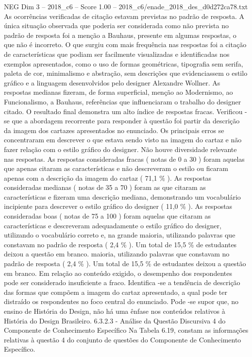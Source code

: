 \begin{textsample}{NEG Dim 3 – 2018\_c6 – Score 1.00 – 2018\_c6/enade\_2018\_des\_d0d272ca78.txt}
As ocorrências verificadas de citação estavam previstas no padrão de resposta.
A única situação observada que poderia ser considerada como não prevista no padrão de resposta foi a menção a Bauhaus, presente em algumas respostas, o que não é incorreto.
O que surgiu com mais frequência nas respostas foi a citação de características que podiam ser facilmente visualizadas e identificadas nos exemplos apresentados, como o uso de formas geométricas, tipografia sem serifa, paleta de cor, minimalismo e abstração, sem descrições que evidenciassem o estilo gráfico e a linguagem desenvolvidos pelo designer Alexandre Wollner.
As respostas medianas fizeram, de forma superficial, menção ao Modernismo, ao Funcionalismo, a Bauhaus, referências que influenciaram o trabalho do designer citado.
O resultado final demonstra um alto índice de respostas fracas.
Verificou -se que a abordagem recorrente para responder à questão foi partir da descrição da imagem dos cartazes apresentados no enunciado.
Os principais erros se concentraram em descrever o que estava sendo visto na imagem do cartaz e não fazer relação com o estilo gráfico do designer.
Não houve diversidade relevante nas respostas.
As respostas consideradas fracas ( notas de 0 a 30 ) foram aquelas que apenas citaram as características e não descreveram o estilo ou ficaram apenas com a descrição da imagem do cartaz ( 71,1 \% ).
As respostas consideradas medianas ( notas de 35 a 70 ) foram as que citaram as características e fizeram uma descrição mediana, demonstrando um vocabulário incipiente para descrever o estilo gráfico do designer ( 11,0 \% ).
As respostas consideradas boas ( notas de 75 a 100 ) foram aquelas que citaram as características e descreveram adequadamente o estilo gráfico do designer, utilizando o vocabulário correto e, na grande maioria, utilizando palavras que constavam no padrão de resposta ( 2,4 \% ).
Um total de 15,5 \% de estudantes deixou a questão em branco. maioria, utilizando palavras que constavam no padrão de resposta ( 2,4 \% ).
Um total de 15,5 \% de estudantes deixou a questão em branco.
Em relação ao conteúdo exigido, o desempenho dos respondentes pode ser considerado insuficiente a fraco.
Identifica -se a tendência de descrição das formas que compõem a imagem do cartaz apresentado, a qual pode ter distraído os respondentes no foco central do enunciado.
Pode -se supor que, no ensino de História do Design, não há uma ênfase nos conteúdos relativos à História do Design Brasileiro. 6.3.2.3 - Análise da Questão Discursiva 4 do Componente de Conhecimento Específico Na Tabela 6.19, constam as informações relativas à questão 4 do conjunto de questões do Componente de Conhecimento Específico.

\end{textsample}
